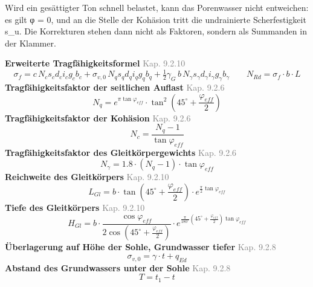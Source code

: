 \documentclass[11pt,a4paper]{article}
\newcommand{\normref}[1]{{\small\textcolor{gray}{#1}}}
\begin{document}
Wird ein gesättigter Ton schnell belastet, kann das Porenwasser nicht entweichen: es gilt φ = 0, und an die Stelle der Kohäsion tritt die undrainierte Scherfestigkeit s\_u. Die Korrekturen stehen dann nicht als Faktoren, sondern als Summanden in der Klammer.

\noindent\textbf{Erweiterte Tragfähigkeitsformel} \hfill \normref{Kap. 9.2.10}
\begin{equation*}
\sigma_f = c \, N_c s_c d_c i_c g_c b_c + \sigma_{v,0} \, N_q s_q d_q i_q g_q b_q + \tfrac{1}{2} \gamma_G \, b \, N_{\gamma} s_{\gamma} d_{\gamma} i_{\gamma} g_{\gamma} b_{\gamma} \qquad N_{Rd} = \sigma_f \cdot b \cdot L
\end{equation*}
\noindent\textbf{Tragfähigkeitsfaktor der seitlichen Auflast} \hfill \normref{Kap. 9.2.6}
\begin{equation*}
N_q = e^{\pi \tan \varphi_{eff}} \cdot \tan^{2}\left(45^\circ + \frac{\varphi_{eff}}{2}\right)
\end{equation*}
\noindent\textbf{Tragfähigkeitsfaktor der Kohäsion} \hfill \normref{Kap. 9.2.6}
\begin{equation*}
N_c = \frac{N_q - 1}{\tan \varphi_{eff}}
\end{equation*}
\noindent\textbf{Tragfähigkeitsfaktor des Gleitkörpergewichts} \hfill \normref{Kap. 9.2.6}
\begin{equation*}
N_{\gamma} = 1.8 \cdot \left(N_q - 1\right) \cdot \tan \varphi_{eff}
\end{equation*}
\noindent\textbf{Reichweite des Gleitkörpers} \hfill \normref{Kap. 9.2.10}
\begin{equation*}
L_{Gl} = b \cdot \tan\left(45^\circ + \frac{\varphi_{eff}}{2}\right) \cdot e^{\frac{\pi}{2} \tan \varphi_{eff}}
\end{equation*}
\noindent\textbf{Tiefe des Gleitkörpers} \hfill \normref{Kap. 9.2.10}
\begin{equation*}
H_{Gl} = b \cdot \frac{\cos \varphi_{eff}}{2 \cos\left(45^\circ + \frac{\varphi_{eff}}{2}\right)} \cdot e^{\frac{\pi}{180^\circ}\left(45^\circ + \frac{\varphi_{eff}}{2}\right) \tan \varphi_{eff}}
\end{equation*}
\noindent\textbf{Überlagerung auf Höhe der Sohle, Grundwasser tiefer} \hfill \normref{Kap. 9.2.8}
\begin{equation*}
\sigma_{v,0} = \gamma \cdot t + q_{Ed}
\end{equation*}
\noindent\textbf{Abstand des Grundwassers unter der Sohle} \hfill \normref{Kap. 9.2.8}
\begin{equation*}
T = t_1 - t
\end{equation*}
\end{document}
